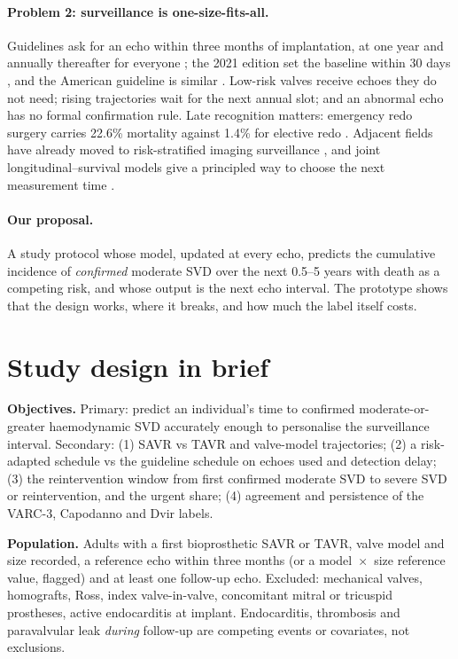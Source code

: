 \documentclass[11pt,a4paper]{article}
\begin{document}
\paragraph{Problem 2: surveillance is one-size-fits-all.} Guidelines ask for an echo within three months of implantation, at one year and annually thereafter for everyone \cite{praz2025}; the 2021 edition set the baseline within 30 days \cite{vahanian2021}, and the American guideline is similar \cite{otto2021}. Low-risk valves receive echoes they do not need; rising trajectories wait for the next annual slot; and an abnormal echo has no formal confirmation rule. Late recognition matters: emergency redo surgery carries 22.6\% mortality against 1.4\% for elective redo \cite{cartlidge2019}. Adjacent fields have already moved to risk-stratified imaging surveillance \cite{hofmann2024}, and joint longitudinal--survival models give a principled way to choose the next measurement time \cite{rizopoulos2016}.

\paragraph{Our proposal.} A study protocol whose model, updated at every echo, predicts the cumulative incidence of \emph{confirmed} moderate SVD over the next 0.5--5 years with death as a competing risk, and whose output is the next echo interval. The prototype shows that the design works, where it breaks, and how much the label itself costs.

\section{Study design in brief}

\textbf{Objectives.} Primary: predict an individual's time to confirmed moderate-or-greater haemodynamic SVD accurately enough to personalise the surveillance interval. Secondary: (1) SAVR vs TAVR and valve-model trajectories; (2) a risk-adapted schedule vs the guideline schedule on echoes used and detection delay; (3) the reintervention window from first confirmed moderate SVD to severe SVD or reintervention, and the urgent share; (4) agreement and persistence of the VARC-3, Capodanno and Dvir labels.

\textbf{Population.} Adults with a first bioprosthetic SAVR or TAVR, valve model and size recorded, a reference echo within three months (or a model~$\times$~size reference value, flagged) and at least one follow-up echo. Excluded: mechanical valves, homografts, Ross, index valve-in-valve, concomitant mitral or tricuspid prostheses, active endocarditis at implant. Endocarditis, thrombosis and paravalvular leak \emph{during} follow-up are competing events or covariates, not exclusions.
\end{document}
